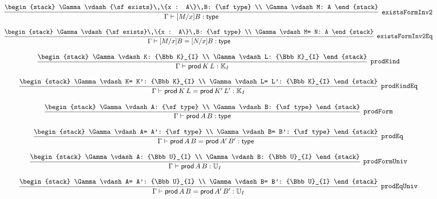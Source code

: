 \[
\infer[{\tt existsFormInv2}]{\Gamma \vdash [M/x]B: {\sf type}}{
\begin{stack}
\Gamma \vdash {\sf exists}\,\{x : A\}\,B: {\sf type}
\\
\Gamma \vdash M: A
\end{stack}}
\]

\[
\infer[{\tt existsFormInv2Eq}]{\Gamma \vdash [M/x]B= [N/x]B: {\sf type}}{
\begin{stack}
\Gamma \vdash {\sf exists}\,\{x : A\}\,B: {\sf type}
\\
\Gamma \vdash M= N: A
\end{stack}}
\]

\[
\infer[{\tt prodKind}]{\Gamma \vdash {\sf prod}\,K\,L: {\Bbb K}_{I}}{
\begin{stack}
\Gamma \vdash K: {\Bbb K}_{I}
\\
\Gamma \vdash L: {\Bbb K}_{I}
\end{stack}}
\]

\[
\infer[{\tt prodKindEq}]{\Gamma \vdash {\sf prod}\,K\,L= {\sf prod}\,K'\,L': {\Bbb K}_{I}}{
\begin{stack}
\Gamma \vdash K= K': {\Bbb K}_{I}
\\
\Gamma \vdash L= L': {\Bbb K}_{I}
\end{stack}}
\]

\[
\infer[{\tt prodForm}]{\Gamma \vdash {\sf prod}\,A\,B: {\sf type}}{
\begin{stack}
\Gamma \vdash A: {\sf type}
\\
\Gamma \vdash B: {\sf type}
\end{stack}}
\]

\[
\infer[{\tt prodEq}]{\Gamma \vdash {\sf prod}\,A\,B= {\sf prod}\,A'\,B': {\sf type}}{
\begin{stack}
\Gamma \vdash A= A': {\sf type}
\\
\Gamma \vdash B= B': {\sf type}
\end{stack}}
\]

\[
\infer[{\tt prodFormUniv}]{\Gamma \vdash {\sf prod}\,A\,B: {\Bbb U}_{I}}{
\begin{stack}
\Gamma \vdash A: {\Bbb U}_{I}
\\
\Gamma \vdash B: {\Bbb U}_{I}
\end{stack}}
\]

\[
\infer[{\tt prodEqUniv}]{\Gamma \vdash {\sf prod}\,A\,B= {\sf prod}\,A'\,B': {\Bbb U}_{I}}{
\begin{stack}
\Gamma \vdash A= A': {\Bbb U}_{I}
\\
\Gamma \vdash B= B': {\Bbb U}_{I}
\end{stack}}
\]

